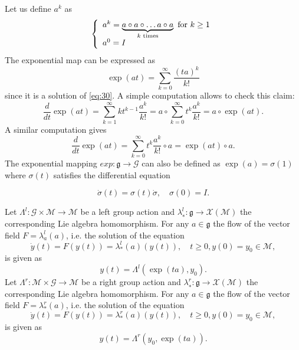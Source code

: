 Let us define $a^k$ as
\begin{equation}
  \label{eq:31}
  \left\{\begin{array}[l]{l}
    a^k = \underbrace{a\circ a \circ \ldots a\circ a}_{k \text{ times}} \text{ for } k \geq 1 \\
    a^0  = I
  \end{array}\right.
\end{equation}
The exponential map can be expressed as
\begin{equation}
  \label{eq:32}
  \exp(at) = \sum_{k=0}^\infty \frac{(ta)^k}{k!}
\end{equation}
since it is  a solution of \eqref{eq:30}. A simple computation allows to check this claim:
\begin{equation}
  \label{eq:33}
   \frac{d}{dt}\exp(at) = \sum_{k=1}^\infty  k t^{k-1} \frac{a^k}{k!} = a \circ \sum_{k=0}^\infty  t^{k} \frac{a^k}{k!} = a \circ \exp(at).
\end{equation}
A similar computation gives
\begin{equation}
  \label{eq:34}
  \frac{d}{dt}\exp(at)  = \sum_{k=0}^\infty  t^{k} \frac{a^k}{k!} \circ a = \exp(at) \circ a.
\end{equation}
The exponential mapping $exp : \mathfrak g \rightarrow \mathcal G$ can also be defined as $\exp(a) = \sigma(1)$ where $\sigma (t)$ satisfies the  differential equation

\begin{equation}
  \label{eq:35}
  \dot \sigma(t) = \sigma(t) \dot \sigma, \quad \sigma (0) = I.
\end{equation}

\begin{theorem}
  Let $\Lambda^l:\mathcal G\times\mathcal M \rightarrow \mathcal M$ be a left  group action and $\lambda^l_{∗} : \mathfrak g\rightarrow \mathcal X(\mathcal M)$ the corresponding Lie algebra homomorphism. For any $a \in \mathfrak g$ the flow of the vector field $F = \lambda^l_{a}(a)$, i.e. the solution of the equation
  \begin{equation}
    \dot y(t) = F(y(t)) = \lambda^l_{*}(a)(y(t)),\quad  t \geq 0, y(0) = y_0 \in \mathcal M,\label{eq:36}
\end{equation}
  is given as
  \begin{equation}
y(t) = \Lambda^l(\exp(ta), y_0).\label{eq:37}
\end{equation}
Let $\Lambda^r:\mathcal M\times\mathcal G \rightarrow \mathcal M$ be a right group action and $\lambda^r_{∗} : \mathfrak g\rightarrow \mathcal X(\mathcal M)$ the corresponding Lie algebra homomorphism. For any $a \in \mathfrak g$ the flow of the vector field $F = \lambda^r_{*}(a)$, i.e. the solution of the equation
  \begin{equation}
    \dot y(t) = F(y(t)) = \lambda^r_{*}(a)(y(t)),\quad  t \geq 0, y(0) = y_0 \in \mathcal M,\label{eq:38}
\end{equation}
  is given as
  \begin{equation}
y(t) = \Lambda^r(y_0,\exp(ta)).\label{eq:39}
\end{equation}

\end{theorem}


